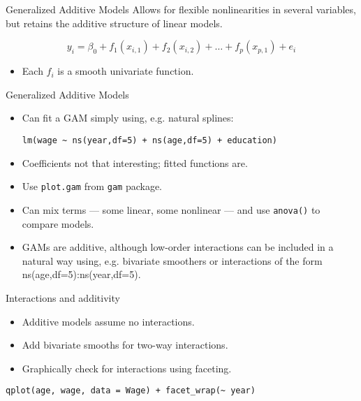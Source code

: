 \documentclass[14pt]{beamer}
\begin{document}
\begin{frame}{Generalized Additive Models}
Allows for flexible nonlinearities in several variables, but retains
the additive structure of linear models.

\begin{block}{}\vspace*{-0.2cm}
$$y_i = \beta_0 + f_1(x_{i,1}) + f_2(x_{i,2}) + \dots + f_p(x_{p,1}) + e_i$$
\end{block}\pause

\begin{itemize}
\item Each $f_i$ is a smooth univariate function.
\end{itemize}
\end{frame}

\begin{frame}[fragile]{Generalized Additive Models}

\begin{itemize}
\item Can fit a GAM simply using, e.g. natural splines:
\begin{footnotesize}
\begin{BVerbatim}
lm(wage ~ ns(year,df=5) + ns(age,df=5) + education)
\end{BVerbatim}
\end{footnotesize}
\item Coefficients not that interesting; fitted functions are. 
\item Use \verb|plot.gam| from \verb|gam| package.
\item  Can mix terms --- some linear, some nonlinear --- and use
\verb|anova()| to compare models.
\item GAMs are additive, although low-order interactions can be
included in a natural way using, e.g. bivariate smoothers or
interactions of the form ns(age,df=5):ns(year,df=5).
\end{itemize}
\end{frame}


\begin{frame}[fragile]{Interactions and additivity}

\begin{itemize}
\item Additive models assume no interactions. 
\item Add bivariate smooths for two-way interactions.
\item Graphically check for interactions using faceting.
\end{itemize}
\pause

\begin{block}{}\small
\begin{BVerbatim}
qplot(age, wage, data = Wage) + facet_wrap(~ year)
\end{BVerbatim}
\end{block}
\end{frame}
\end{document}
